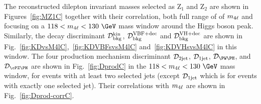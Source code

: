 The reconstructed dilepton invariant masses selected as Z$_1$ and Z$_2$ are shown in Figures~\ref{fig:MZ1C} together with their correlation, both full range of of $m_{4\ell}$ and focusing on a $118<\mllll<130~\GeV$ mass window around the Higgs boson peak.
Similarly, the decay discriminant ${\cal D}^{\rm kin}_{\rm bkg}$, ${\mathcal{D}}^{\mathrm{VBF}+\mathrm{dec}}_{\mathrm{bkg}}$ and ${\mathcal{D}}^{\mathrm{VH}+\mathrm{dec}}_{\mathrm{bkg}}$ are shown in Fig.~\ref{fig:KDvsM4lC},~\ref{fig:KDVBFsvsM4lC} and~\ref{fig:KDVHsvsM4lC} in this window. %
The four production mechanism discriminant ${\mathcal D}_{\rm 2jet}$, ${\mathcal D}_{\rm 1jet}$, $\DMeWh$, and $\DMeZh$ are shown in Fig.~\ref{fig:DprodC} in the $118<\mllll<130~\GeV$ mass window, for events with at least two selected jets (except ${\mathcal D}_{\rm 1jet}$ which is for events with exactly one selected jet). 
Their correlations with $m_{4\ell}$ are shown in Fig.~\ref{fig:Dprod-corrC}. 

